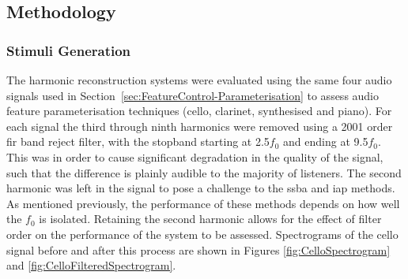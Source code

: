 	\subsection{Methodology}
	\label{sec:PerceptualExperiments-Reconstruction-Methodology}
		\subsubsection*{Stimuli Generation}
			The harmonic reconstruction systems were evaluated using the same four audio signals used in
			Section~\ref{sec:FeatureControl-Parameterisation} to assess audio feature parameterisation
			techniques (cello, clarinet, synthesised and piano). For each signal the third through ninth
			harmonics were removed using a 2001 order \acrshort{fir} band reject filter, with the
			stopband starting at 2.5$f_{0}$ and ending at 9.5$f_{0}$. This was in order to cause significant
			degradation in the quality of the signal, such that the difference is plainly audible to the
			majority of listeners. The second harmonic was left in the signal to pose a challenge to the
			\acrshort{ssba} and \acrshort{iap} methods. As mentioned previously, the performance of these
			methods depends on how well the $f_{0}$ is isolated.  Retaining the second harmonic allows for the
			effect of filter order on the performance of the system to be assessed. Spectrograms of the cello
			signal before and after this process are shown in Figures \ref{fig:CelloSpectrogram} and
			\ref{fig:CelloFilteredSpectrogram}. 

